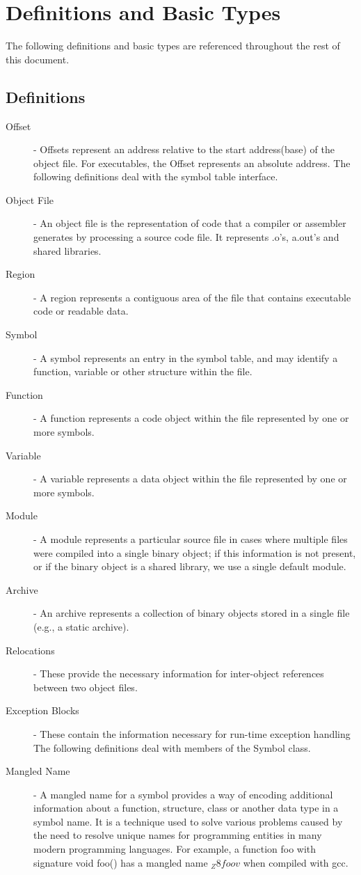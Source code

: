 \section{Definitions and Basic Types}

The following definitions and basic types are referenced throughout the rest of this document.

\subsection{Definitions}

\begin{description}
\item[Offset] - Offsets represent an address relative to the start address(base) of the object file. For executables, the Offset represents an absolute address.
The following definitions deal with the symbol table interface.
\item[Object File] - An object file is the representation of code that a compiler or assembler generates by processing a source code file. It represents .o's, a.out's and shared libraries.
\item[Region] - A region represents a contiguous area of the file that contains executable code or readable data.
\item[Symbol] - A symbol represents an entry in the symbol table, and may identify a function, variable or other structure within the file.
\item[Function] - A function represents a code object within the file represented by one or more symbols.
\item[Variable] - A variable represents a data object within the file represented by one or more symbols.
\item[Module] - A module represents a particular source file in cases where multiple files were compiled into a single binary object; if this information is not present, or if the binary object is a shared library, we use a single default module.
\item[Archive] - An archive represents a collection of binary objects stored in a single file (e.g., a static archive). 
\item[Relocations] - These provide the necessary information for inter-object references between two object files. 
\item[Exception Blocks] - These contain the information necessary for run-time exception handling
The following definitions deal with members of the Symbol class.
\item[Mangled Name] - A mangled name for a symbol provides a way of encoding additional information about a function, structure, class or another data type in a symbol name. It is a technique used to solve various problems caused by the need to resolve unique names for programming entities in many modern programming languages. For example, a function foo with signature void foo() has a mangled name $_Z8foov$ when compiled with gcc.

\end{description}
